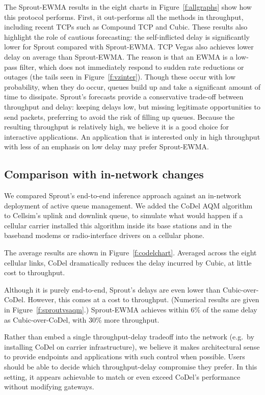 The Sprout-EWMA results in the eight charts in Figure~\ref{f:allgraphs}
show how this protocol performs. First, it out-performs all the
methods in throughput, including recent TCPs such as Compound TCP and
Cubic. These results also highlight the role of cautious forecasting:
the self-inflicted delay is significantly lower for Sprout compared
with Sprout-EWMA. TCP Vegas also achieves lower delay on average than
Sprout-EWMA. The reason is that an EWMA is a low-pass filter, which
does not immediately respond to sudden rate reductions or outages (the
tails seen in Figure~\ref{f:vzinter}). Though these occur with low
probability, when they do occur, queues build up and take a
significant amount of time to dissipate.  Sprout's forecasts provide a
conservative trade-off between throughput and delay: keeping delays
low, but missing legitimate opportunities to send
packets, preferring to avoid the risk of filling up queues. Because
the resulting throughput is relatively high, we believe it is a good
choice for interactive applications. An application that is interested
only in high throughput with less of an emphasis on low delay may prefer
Sprout-EWMA.

\subsection{Comparison with in-network changes}

We compared Sprout's end-to-end inference approach against an
in-network deployment of active queue management. We added the CoDel
AQM algorithm~\cite{CoDel} to Cellsim's uplink and downlink queue, to
simulate what would happen if a cellular carrier installed this
algorithm inside its base stations and in the baseband modems or
radio-interface drivers on a cellular phone.

The average results are shown in Figure~\ref{f:codelchart}. Averaged
across the eight cellular links, CoDel dramatically reduces the delay
incurred by Cubic, at little cost to throughput.

Although it is purely end-to-end, Sprout's delays are even lower than
Cubic-over-CoDel. However, this comes at a cost to
throughput. (Numerical results are given in Figure~\ref{f:sproutvsaqm}.)
Sprout-EWMA achieves within 6\% of the same delay as Cubic-over-CoDel,
with 30\% more throughput.

Rather than embed a single throughput-delay tradeoff into the network
(e.g.~by installing CoDel on carrier infrastructure), we believe it
makes architectural sense to provide endpoints and applications with
such control when possible. Users should be able to decide which
throughput-delay compromise they prefer. In this setting, it appears
achievable to match or even exceed CoDel's performance without
modifying gateways.

